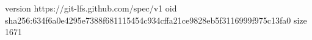 version https://git-lfs.github.com/spec/v1
oid sha256:634f6a0e4295e7388f681115454c934cffa21ce9828eb5f3116999f975c13fa0
size 1671
